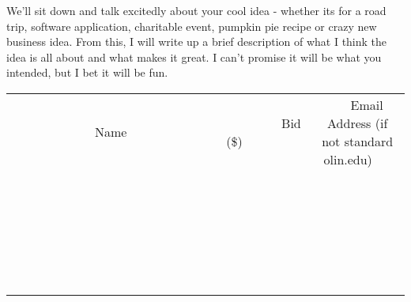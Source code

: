 \documentclass[11pt]{article}
\begin{document}
We'll sit down and talk excitedly about your cool idea - whether its for a road trip, software application, charitable event, pumpkin pie recipe or crazy new business idea. From this, I will write up a brief description of what I think the idea is all about and what makes it great. I can't promise it will be what you intended, but I bet it will be fun.
\\[6ex]
\begin{tabular}{c c c}
~~~~~~~~~~~~~Name~~~~~~~~~~~~~ & ~~~~~~~~~Bid (\$)~~~~~~~~~  & ~~~Email Address (if not standard olin.edu)~~~\\
 & & \\
\hline
 & & \\
\hline
 & & \\
\hline
 & & \\
\hline
 & & \\
\hline
 & & \\
\hline
 & & \\
\hline
 & & \\
\hline
 & & \\
\hline
 & & \\
\hline
 & & \\
\hline
 & & \\
\hline
 & & \\
\hline
 & & \\
\hline
 & & \\
\hline
 & & \\
\hline
 & & \\
\hline
 & & \\
\hline
 & & \\
\hline
 & & \\
\hline
 & & \\
\hline
 & & \\
\hline
 & & \\
\hline
 & & \\
\hline
 & & \\
\hline
 & & \\
\hline
\end{tabular}
\newpage
\end{document}
